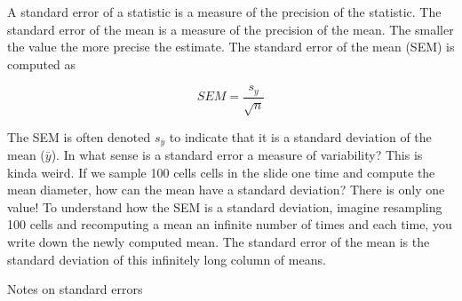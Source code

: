 \documentclass[]{book}
\theoremstyle{definition}
\theoremstyle{definition}
\theoremstyle{definition}
\theoremstyle{remark}
\begin{document}
A standard error of a statistic is a measure of the precision of the
statistic. The standard error of the mean is a measure of the precision
of the mean. The smaller the value the more precise the estimate. The
standard error of the mean (SEM) is computed as

\begin{equation}
SEM = \frac{s_y}{\sqrt{n}}
\label{eq:se}
\end{equation}

The SEM is often denoted \(s_{\bar{y}}\) to indicate that it is a
standard deviation of the mean (\(\bar{y}\)). In what sense is a
standard error a measure of variability? This is kinda weird. If we
sample 100 cells cells in the slide one time and compute the mean
diameter, how can the mean have a standard deviation? There is only one
value! To understand how the SEM is a standard deviation, imagine
resampling 100 cells and recomputing a mean an infinite number of times
and each time, you write down the newly computed mean. The standard
error of the mean is the standard deviation of this infinitely long
column of means.

Notes on standard errors
\end{document}
